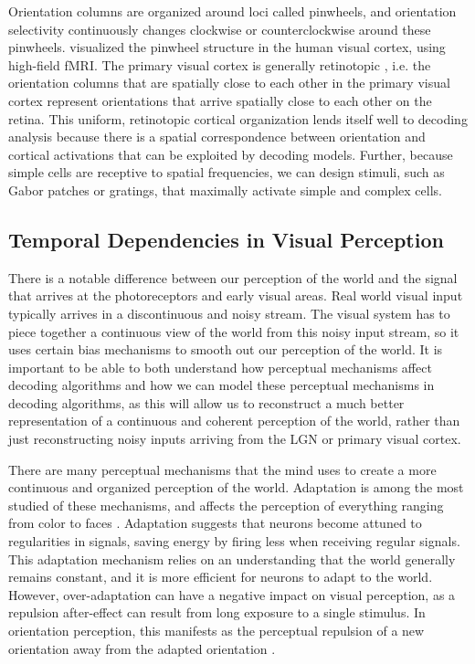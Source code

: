 \documentclass[../main.tex]{subfiles}
\begin{document}
Orientation columns are organized around loci called pinwheels, and orientation selectivity continuously changes clockwise or counterclockwise around these pinwheels. \cite{Yacoub10607} visualized the pinwheel structure in the human visual cortex, using high-field fMRI. The primary visual cortex is generally retinotopic \citep{Engel_97}, i.e. the orientation columns that are spatially close to each other in the primary visual cortex represent orientations that arrive spatially close to each other on the retina. This uniform, retinotopic cortical organization lends itself well to decoding analysis because there is a spatial correspondence between orientation and cortical activations that can be exploited by decoding models. Further, because simple cells are receptive to spatial frequencies, we can design stimuli, such as Gabor patches or gratings, that maximally activate simple and complex cells. 

\subsection*{Temporal Dependencies in Visual Perception}
There is a notable difference between our perception of the world and the signal that arrives at the photoreceptors and early visual areas. Real world visual input typically arrives in a discontinuous and noisy stream. The visual system has to piece together a continuous view of the world from this noisy input stream, so it uses certain bias mechanisms to smooth out our perception of the world. It is important to be able to both understand how perceptual mechanisms affect decoding algorithms and how we can model these perceptual mechanisms in decoding algorithms, as this will allow us to reconstruct a much better representation of a continuous and coherent perception of the world, rather than just reconstructing noisy inputs arriving from the LGN or primary visual cortex.

There are many perceptual mechanisms that the mind uses to create a more continuous and organized perception of the world. Adaptation is among the most studied of these mechanisms, and affects the perception of everything ranging from color \citep{webster_mollon_1997} to faces \citep{webster_macleod_2011}. Adaptation suggests that neurons become attuned to regularities in signals, saving energy by firing less when receiving regular signals. This adaptation mechanism relies on an understanding that the world generally remains constant, and it is more efficient for neurons to adapt to the world. However, over-adaptation can have a negative impact on visual perception, as a repulsion after-effect can result from long exposure to a single stimulus. In orientation perception, this manifests as the perceptual repulsion of a new orientation away from the adapted orientation \citep{He_sheng}.
\end{document}
